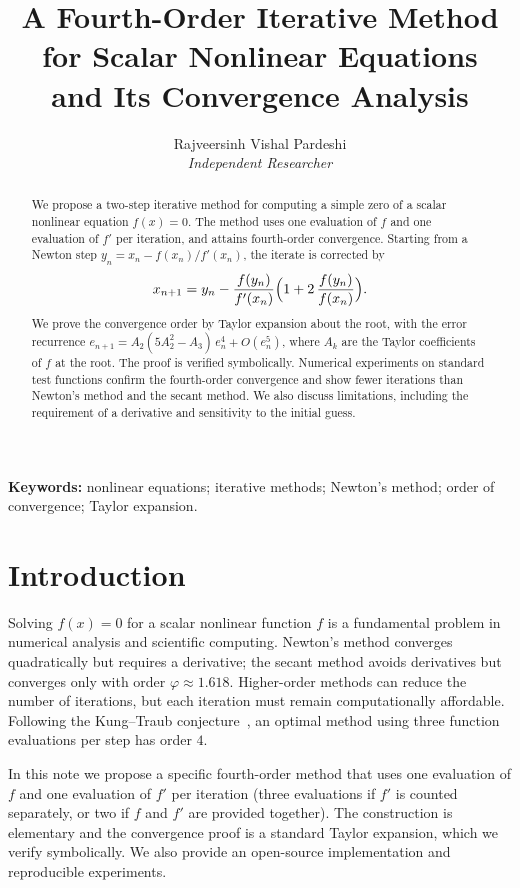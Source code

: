 \documentclass[11pt]{article}
\title{A Fourth-Order Iterative Method for Scalar Nonlinear Equations\\
and Its Convergence Analysis}
\author{Rajveersinh Vishal Pardeshi\\
\textit{Independent Researcher}}
\date{}
\begin{document}
\maketitle

\begin{abstract}
We propose a two-step iterative method for computing a simple zero of a
scalar nonlinear equation $f(x)=0$. The method uses one evaluation of $f$
and one evaluation of $f'$ per iteration, and attains fourth-order
convergence. Starting from a Newton step
$y_n=x_n-f(x_n)/f'(x_n)$, the iterate is corrected by
\[
x_{n+1}=y_n-\frac{f(y_n)}{f'(x_n)}\Bigl(1+2\,\frac{f(y_n)}{f(x_n)}\Bigr).
\]
We prove the convergence order by Taylor expansion about the root, with
the error recurrence $e_{n+1}=A_2(5A_2^2-A_3)\,e_n^4+O(e_n^5)$,
where $A_k$ are the Taylor coefficients of $f$ at the root. The proof
is verified symbolically. Numerical experiments on standard test
functions confirm the fourth-order convergence and show fewer iterations
than Newton's method and the secant method. We also discuss limitations,
including the requirement of a derivative and sensitivity to the initial
guess.
\end{abstract}

\textbf{Keywords:} nonlinear equations; iterative methods; Newton's method;
order of convergence; Taylor expansion.

\section{Introduction}
Solving $f(x)=0$ for a scalar nonlinear function $f$ is a fundamental
problem in numerical analysis and scientific computing. Newton's method
converges quadratically but requires a derivative; the secant method
avoids derivatives but converges only with order $\varphi\approx1.618$.
Higher-order methods can reduce the number of iterations, but each
iteration must remain computationally affordable. Following the
Kung--Traub conjecture~\cite{KungTraub1974}, an optimal method using
three function evaluations per step has order $4$.

In this note we propose a specific fourth-order method that uses one
evaluation of $f$ and one evaluation of $f'$ per iteration (three
evaluations if $f'$ is counted separately, or two if $f$ and $f'$ are
provided together). The construction is elementary and the convergence
proof is a standard Taylor expansion, which we verify symbolically. We
also provide an open-source implementation and reproducible experiments.
\end{document}
